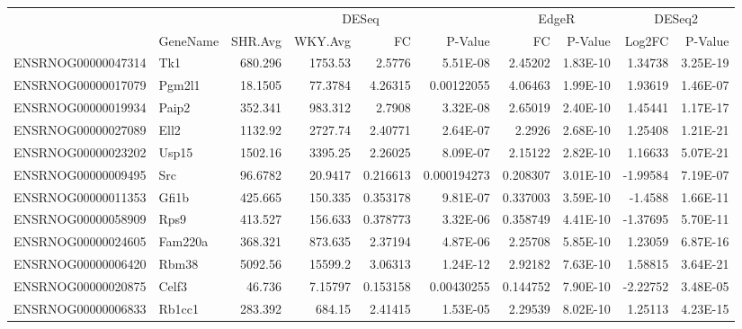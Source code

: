 \begin{sidewaystable}[]
\scriptsize
\centering
\begin{tabular}{llrrrrrrrr}
                   &          & \multicolumn{4}{c}{DESeq}                            & \multicolumn{2}{c}{EdgeR} & \multicolumn{2}{c}{DESeq2} \\
                   & GeneName & SHR.Avg & WKY.Avg & FC       & P-Value     & FC          & P-Value     & Log2FC       & P-Value     \\
                   \hline
ENSRNOG00000047314 & Tk1      & 680.296      & 1753.53      & 2.5776   & 5.51E-08    & 2.45202     & 1.83E-10    & 1.34738      & 3.25E-19    \\
ENSRNOG00000017079 & Pgm2l1   & 18.1505      & 77.3784      & 4.26315  & 0.00122055  & 4.06463     & 1.99E-10    & 1.93619      & 1.46E-07    \\
ENSRNOG00000019934 & Paip2    & 352.341      & 983.312      & 2.7908   & 3.32E-08    & 2.65019     & 2.40E-10    & 1.45441      & 1.17E-17    \\
ENSRNOG00000027089 & Ell2     & 1132.92      & 2727.74      & 2.40771  & 2.64E-07    & 2.2926      & 2.68E-10    & 1.25408      & 1.21E-21    \\
ENSRNOG00000023202 & Usp15    & 1502.16      & 3395.25      & 2.26025  & 8.09E-07    & 2.15122     & 2.82E-10    & 1.16633      & 5.07E-21    \\
ENSRNOG00000009495 & Src      & 96.6782      & 20.9417      & 0.216613 & 0.000194273 & 0.208307    & 3.01E-10    & -1.99584     & 7.19E-07    \\
ENSRNOG00000011353 & Gfi1b    & 425.665      & 150.335      & 0.353178 & 9.81E-07    & 0.337003    & 3.59E-10    & -1.4588      & 1.66E-11    \\
ENSRNOG00000058909 & Rps9     & 413.527      & 156.633      & 0.378773 & 3.32E-06    & 0.358749    & 4.41E-10    & -1.37695     & 5.70E-11    \\
ENSRNOG00000024605 & Fam220a  & 368.321      & 873.635      & 2.37194  & 4.87E-06    & 2.25708     & 5.85E-10    & 1.23059      & 6.87E-16    \\
ENSRNOG00000006420 & Rbm38    & 5092.56      & 15599.2      & 3.06313  & 1.24E-12    & 2.92182     & 7.63E-10    & 1.58815      & 3.64E-21    \\
ENSRNOG00000020875 & Celf3    & 46.736       & 7.15797      & 0.153158 & 0.00430255  & 0.144752    & 7.90E-10    & -2.22752     & 3.48E-05    \\
ENSRNOG00000006833 & Rb1cc1   & 283.392      & 684.15       & 2.41415  & 1.53E-05    & 2.29539     & 8.02E-10    & 1.25113      & 4.23E-15    \\

\end{tabular}
\end{sidewaystable}
